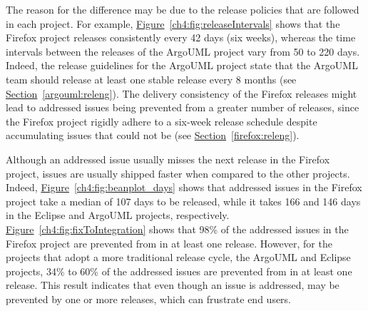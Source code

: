 The reason for the difference may be due to the release policies that are
followed in each project. For example,
\hyperref[ch4:fig:releaseIntervals]{Figure}~\ref{ch4:fig:releaseIntervals} shows that
the Firefox project releases consistently every 42 days (six weeks), whereas the
time intervals between the releases of the ArgoUML project vary from 50 to 220
days. Indeed, the release guidelines for the ArgoUML project state that the
ArgoUML team should release at least one stable release every 8 months (see
\hyperref[argouml:releng]{Section}~\ref{argouml:releng}). The delivery
consistency of the Firefox releases might lead to addressed issues being prevented
from a greater number of releases, since the Firefox project rigidly adhere to a
six-week release schedule despite accumulating issues that could not be
\DIFdelbegin {}\DIFdelend \DIFaddbegin {}\DIFaddend (see \hyperref[firefox:releng]{Section}~\ref{firefox:releng}). 

Although an addressed issue usually misses the next release in the Firefox
project, issues are usually shipped faster when compared to the other projects.
Indeed, \hyperref[ch4:fig:beanplot_days]{Figure}~\ref{ch4:fig:beanplot_days} shows that
addressed issues in the Firefox project take a median of 107 days to be
released, while it takes 166 and 146 days in the Eclipse and ArgoUML projects,
respectively.\\

\noindent\DIFdelbegin \textit{\textbf{}%
}
\DIFdelend \DIFaddbegin {}
\DIFaddend \hyperref[ch4:fig:fixToIntegration]{Figure}~\ref{ch4:fig:fixToIntegration} shows
that 98\% of the addressed issues in the Firefox project are prevented from
\DIFdelbegin {}\DIFdelend \DIFaddbegin {}\DIFaddend in at least one release. However, for the projects that adopt a more
traditional release cycle, \ie the ArgoUML and Eclipse projects, 34\% to 60\%
of the addressed issues are prevented from \DIFdelbegin {}\DIFdelend \DIFaddbegin {}\DIFaddend in at least one release.
This result indicates that even though an issue is addressed, \DIFdelbegin {}\DIFdelend \DIFaddbegin {}\DIFaddend may be
prevented by one or more releases, which can frustrate end users.\\

